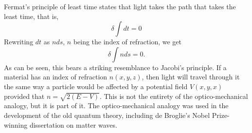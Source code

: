 \documentclass{article}
\begin{document}
Fermat's principle of least time states that light takes the path that takes the least time, that is,
\begin{equation}
\delta\int dt=0
\end{equation}
Rewriting $dt$ as $n ds$, $n$ being the index of refraction, we get
\begin{equation}
\delta\int nds=0.
\end{equation}
As can be seen, this bears a striking resemblance to Jacobi's principle. If a material has an index of refraction $n(x,y,z)$, then light will travel through it the same way a particle would be affected by a potential field $V(x,y,x)$ provided that $n=\sqrt{2(E-V)}$. This is not the entirety of the optico-mechanical analogy, but it is part of it. The optico-mechanical analogy was used in the development of the old quantum theory, including de Broglie's Nobel Prize-winning dissertation on matter waves.
\end{document}

